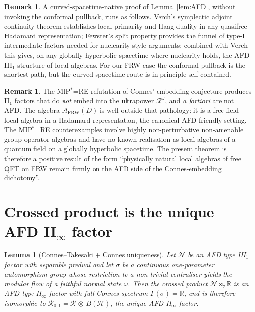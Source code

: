 \documentclass[11pt]{article}
\newtheorem{lemma}[theorem]{Lemma}
\theoremstyle{definition}
\newtheorem{remark}[theorem]{Remark}
\newcommand{\R}{\mathbb{R}}
\newcommand{\HH}{\mathcal{H}}
\renewcommand{\AA}{\mathcal{A}}
\newcommand{\RR}{\mathcal{R}}
\newcommand{\FRW}{\mathrm{FRW}}
\newcommand{\NN}{\mathcal{N}}
\begin{document}
\begin{remark}\label{rmk:curved-direct}
A curved-spacetime-native proof of Lemma~\ref{lem:AFD}, without invoking
the conformal pullback, runs as follows. Verch's symplectic adjoint
continuity theorem \cite{Verch1997} establishes local primarity and
Haag duality in any quasifree Hadamard representation; Fewster's split
property \cite{Fewster2015Split} provides the funnel of type-I
intermediate factors needed for nuclearity-style arguments; combined
with Verch \cite{Verch1994} this gives, on any globally hyperbolic
spacetime where nuclearity holds, the AFD III$_1$ structure of local
algebras. For our FRW case the conformal pullback is the
shortest path, but the curved-spacetime route is in principle
self-contained.
\end{remark}

\begin{remark}\label{rmk:no-MIP}
The MIP$^*$=RE refutation of Connes' embedding conjecture
\cite{JNVWY2020} produces II$_1$ factors that do \emph{not} embed into
the ultrapower $\RR^\omega$, and \emph{a fortiori} are not AFD. The
algebra $\AA_\FRW(D)$ is well outside that pathology: it is a free-field
local algebra in a Hadamard representation, the canonical AFD-friendly
setting. The MIP$^*$=RE counterexamples involve highly non-perturbative
non-amenable group operator algebras and have no known realisation as
local algebras of a quantum field on a globally hyperbolic spacetime.
The present theorem is therefore a positive result of the form
``physically natural local algebras of free QFT on FRW remain firmly on
the AFD side of the Connes-embedding dichotomy''.
\end{remark}

\section{Crossed product is the unique AFD II$_\infty$ factor}\label{sec:CT}

\begin{lemma}[Connes--Takesaki + Connes uniqueness]\label{lem:CT}
Let $\NN$ be an AFD type III$_1$ factor with separable predual and let
$\sigma$ be a continuous one-parameter automorphism group whose
restriction to a non-trivial centraliser yields the modular flow of a
faithful normal state $\omega$. Then the crossed product
$\NN\rtimes_\sigma\R$ is an AFD type II$_\infty$ factor with full Connes
spectrum $\Gamma(\sigma)=\R$, and is therefore isomorphic to
$\RR_{0,1}=\RR\,\overline{\otimes}\,B(\HH)$, the unique AFD II$_\infty$
factor.
\end{lemma}
\end{document}

